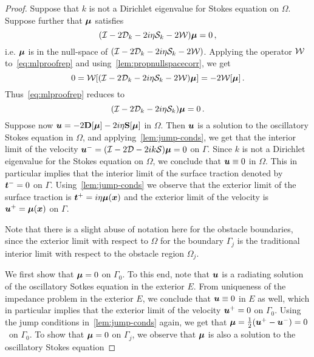 \begin{proof}
Suppose that $k$ is not a Dirichlet eigenvalue for Stokes equation on
$\Omega$. 
Suppose further that ${\boldsymbol \mu}$ satisfies
\begin{equation}
(\mathcal I - 2{\mathcal D}_{k} -2i\eta{\mathcal S}_{k} - 2{\mathcal W}) {\boldsymbol \mu} = 0 \, , \label{eq:mlproofrep}
\end{equation}
i.e. ${\boldsymbol \mu}$ is in the null-space
of $(\mathcal I - 2 {\mathcal D}_{k} - 2i\eta {\mathcal S}_{k} - 2 {\mathcal W})$. 
Applying the operator ${\mathcal W}$ to~\cref{eq:mlproofrep} and 
using~\cref{lem:propnullspacecorr}, we get
\begin{equation}
0 = {\mathcal W} [(\mathcal I - 2{\mathcal D}_{k} - 2i\eta{\mathcal S}_{k} - 2{\mathcal W}){\boldsymbol \mu}] = -2{\mathcal W} [{\boldsymbol \mu}] \, .
\end{equation}
Thus~\cref{eq:mlproofrep} reduces to
\begin{equation}
(\mathcal I - 2 {\mathcal D}_{k} - 2i\eta {\mathcal S}_{k}){\boldsymbol \mu} = 0\, .
\end{equation}
Suppose now ${\boldsymbol u} = -2{\bf D}[{\boldsymbol \mu}] -2i\eta{\bf S}[{\boldsymbol \mu}]$ in $\Omega$.
Then ${\boldsymbol u}$ is a solution to the oscillatory Stokes equation in $\Omega$,
and applying~\cref{lem:jump-conds}, we get that the interior
limit of the velocity ${\boldsymbol u}^{-} = (\mathcal I - 2{\mathcal D} -2ik{\mathcal S}) {\boldsymbol \mu} = 0$ on $\Gamma$. 
Since $k$ is not a Dirichlet eigenvalue for the Stokes equation on 
$\Omega$, we conclude that ${\boldsymbol u} \equiv 0$ in $\Omega$. 
This in particular implies that the interior limit of the surface traction
denoted by ${\boldsymbol t}^{-} = 0$ on $\Gamma$.
Using~\cref{lem:jump-conds}  
we observe that the exterior limit 
of the surface traction is ${\boldsymbol t}^{+} = i\eta {\boldsymbol \mu}({\boldsymbol x})$
and the exterior limit of the velocity is 
${\boldsymbol u}^{+} = {\boldsymbol \mu}({\boldsymbol x})$ on $\Gamma$.
\begin{remark}
Note that there is a slight abuse of notation here for the obstacle
boundaries, since the exterior limit with respect to $\Omega$ 
for the boundary $\Gamma_{j}$ is the traditional interior 
limit with respect to the obstacle region $\Omega_{j}$.
\end{remark}
We first show that ${\boldsymbol \mu}=0$ on $\Gamma_{0}$. 
To this end, note that ${\boldsymbol u}$ is a radiating solution of the oscillatory
Sotkes equation in the exterior $E$.
From uniqueness of the impedance problem in the exterior $E$, we conclude
that ${\boldsymbol u} \equiv 0$ in $E$ as well, which in particular implies that
the exterior limit of the velocity ${\boldsymbol u}^{+}=0$ on $\Gamma_{0}$.   
Using the jump conditions in~\cref{lem:jump-conds} again, we
get that ${\boldsymbol \mu} = \frac{1}{2}({\boldsymbol u}^{+} - {\boldsymbol u}^{-}) = 0$ \, on
$\Gamma_{0}$. 
To show that ${\boldsymbol \mu}=0$ on $\Gamma_{j}$, we observe that
${\boldsymbol \mu}$ is also a solution to the oscillatory Stokes equation

\end{proof}
